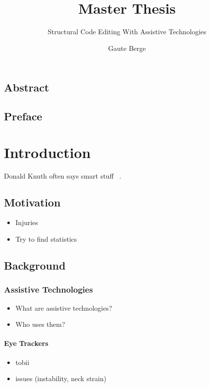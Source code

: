 \documentclass[a4paper,english]{ifimaster}
\title{Master Thesis}
\subtitle{Structural Code Editing With Assistive Technologies}
\author{Gaute Berge}
\begin{document}
\duoforside[dept={Department of Informatics},
program={Informatics: Programming and System Architecture},
long]

\frontmatter{}
\chapter*{Abstract}

\tableofcontents{}
\listoffigures{}
\listoftables{}

\chapter*{Preface}

\mainmatter{}
\part{Introduction}

Donald Knuth often says smart stuff ~\parencite{Knuth:2007:CPA:1283920.1283929}.

\chapter{Motivation}
\begin{itemize}
    \item{Injuries}
    \item{Try to find statistics}
\end{itemize}

\chapter{Background}

\section{Assistive Technologies}

\begin{itemize}
    \item{What are assistive technologies?}
    \item{Who uses them?}
\end{itemize}

\subsection{Eye Trackers}
\begin{itemize}
    \item{tobii}
    \item{issues (instability, neck strain)}
\end{itemize}
\end{document}
